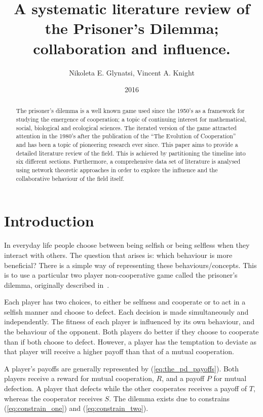 \documentclass{article}
\title{A systematic literature review of the Prisoner's Dilemma; collaboration and influence.}
\author{Nikoleta E. Glynatsi, Vincent A. Knight}
\date{2016}
\theoremstyle{definition}
\begin{document}
\maketitle

\begin{abstract}
    The prisoner's dilemma is a well known game used since the 1950's as a framework
    for studying the emergence of cooperation; a topic of continuing interest
    for mathematical, social, biological and ecological sciences. The iterated version
    of the game attracted attention in the 1980's after
    the publication of the ``The Evolution of Cooperation'' and has been a topic
    of pioneering research ever since. This paper aims to provide a detailed
    literature review of the field. This is achieved by partitioning the timeline into six different
    sections. Furthermore, a comprehensive data set of literature is analysed
    using network theoretic approaches in order to explore the influence and the
    collaborative behaviour of the field itself.
\end{abstract}

\section{Introduction}\label{section:introduction}

In everyday life people choose between being selfish or being selfless when they
interact with others. The question that arises is: which behaviour is more beneficial?
There is a simple way of representing these behaviours/concepts. This is to use a
particular two player non-cooperative game called the prisoner's dilemma, originally
described in~\cite{Flood1958}.

Each player has two choices, to either be selfness and cooperate or to act in a
selfish manner and choose to defect. Each decision is made simultaneously and independently.
The fitness of each player is influenced by its own behaviour, and the behaviour
of the opponent. Both players do better if they choose to cooperate than if both
choose to defect. However, a player has the temptation to deviate as that player will
receive a higher payoff than that of a mutual cooperation.

A player's payoffs are generally represented by (\ref{eq:the_pd_payoffs}). Both
players receive a reward for mutual cooperation, \(R\), and a payoff \(P\) for
mutual defection. A player that defects while the other cooperates receives a payoff of
\(T\), whereas the cooperator receives \(S\). The dilemma exists due
to constrains (\ref{eq:constrain_one}) and (\ref{eq:constrain_two}).
\end{document}
